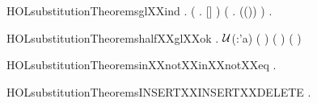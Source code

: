 \newcommand{\HOLsubstitutionTheoremsglXXdef}{\UseVerbatim{HOLsubstitutionTheoremsglXXdef}}
\begin{SaveVerbatim}{HOLsubstitutionTheoremsglXXind}
\HOLTokenTurnstile{} \HOLSymConst{\HOLTokenForall{}}.
     (\HOLSymConst{\HOLTokenForall{}} .  []  ) \HOLSymConst{\HOLTokenConj{}}
     (\HOLSymConst{\HOLTokenForall{}}    .     \HOLSymConst{\HOLTokenImp{}}  ((\HOLSymConst{,})\HOLSymConst{::})  ) \HOLSymConst{\HOLTokenImp{}}
     \HOLSymConst{\HOLTokenForall{}}  .    
\end{SaveVerbatim}
\newcommand{\HOLsubstitutionTheoremsglXXind}{\UseVerbatim{HOLsubstitutionTheoremsglXXind}}
\begin{SaveVerbatim}{HOLsubstitutionTheoremshalfXXglXXok}
\HOLTokenTurnstile{} \HOLSymConst{\HOLTokenForall{}}  .
      \ensuremath{\cal{U}}(:'a) \HOLSymConst{\HOLTokenConj{}}   \HOLSymConst{\HOLTokenConj{}}   (  ) \HOLSymConst{\HOLTokenImp{}}
      (   ) (  )
\end{SaveVerbatim}
\newcommand{\HOLsubstitutionTheoremshalfXXglXXok}{\UseVerbatim{HOLsubstitutionTheoremshalfXXglXXok}}
\begin{SaveVerbatim}{HOLsubstitutionTheoremsinXXnotXXinXXnotXXeq}
\HOLTokenTurnstile{} \HOLSymConst{\HOLTokenForall{}}  .  \HOLConst{\HOLTokenIn{}}  \HOLSymConst{\HOLTokenConj{}}  \HOLConst{\HOLTokenNotIn{}}  \HOLSymConst{\HOLTokenImp{}}  \HOLSymConst{\HOLTokenNotEqual{}} 
\end{SaveVerbatim}
\newcommand{\HOLsubstitutionTheoremsinXXnotXXinXXnotXXeq}{\UseVerbatim{HOLsubstitutionTheoremsinXXnotXXinXXnotXXeq}}
\begin{SaveVerbatim}{HOLsubstitutionTheoremsINSERTXXINSERTXXDELETE}
\HOLTokenTurnstile{} \HOLSymConst{\HOLTokenForall{}} .      \HOLSymConst{=}   
\end{SaveVerbatim}
